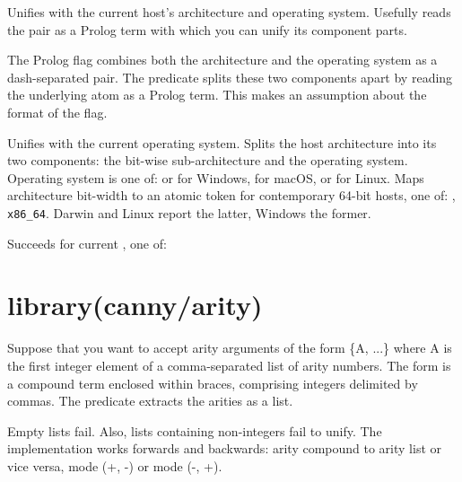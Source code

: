 \begin{description}
Unifies  with the current host's architecture and operating
system. Usefully reads the pair as a Prolog term with which you can
unify its component parts.

The Prolog  flag combines both the architecture and the
operating system as a dash-separated pair. The predicate splits
these two components apart by reading the underlying atom as a
Prolog term. This makes an assumption about the format of the 
flag.

Unifies  with the current operating system. Splits the host
architecture into its two components: the bit-wise sub-architecture
and the operating system. Operating system is one of:  or
 for Windows,  for macOS, or  for Linux. Maps
architecture bit-width to an atomic  token for contemporary
64-bit hosts, one of: , \verb$x86_64$. Darwin and Linux report the
latter, Windows the former.

Succeeds for current , one of:

\begin{shortlist}
    \item {}
    \item {}
    \item {}
    \item {}
\end{shortlist}
\end{description}

\chapter{library(canny/arity)}\label{sec:arity}

\begin{description}
Suppose that you want to accept arity arguments of the form \{A, ...\}
where A is the first integer element of a comma-separated list of
arity numbers. The  form is a compound term enclosed within
braces, comprising integers delimited by commas. The 
predicate extracts the arities as a list.

Empty lists fail. Also, lists containing non-integers fail to unify.
The implementation works forwards and backwards: arity compound to
arity list or vice versa, mode (+, -) or mode (-, +).
\end{description}

